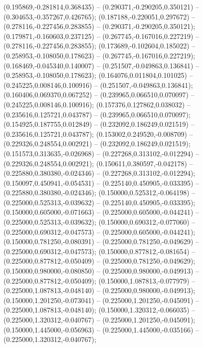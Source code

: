  (0.195869,-0.281814,0.368435) -- (0.290371,-0.290205,0.350121) -- (0.304653,-0.357267,0.426765);
 (0.187188,-0.220051,0.297672) -- (0.278116,-0.227456,0.283855) -- (0.290371,-0.290205,0.350121);
 (0.179871,-0.160603,0.237125) -- (0.267745,-0.167016,0.227219) -- (0.278116,-0.227456,0.283855);
 (0.173689,-0.102604,0.185022) -- (0.258953,-0.108050,0.178623) -- (0.267745,-0.167016,0.227219);
 (0.168469,-0.045340,0.140007) -- (0.251507,-0.049863,0.136841) -- (0.258953,-0.108050,0.178623);
 (0.164076,0.011804,0.101025) -- (0.245225,0.008146,0.100916) -- (0.251507,-0.049863,0.136841);
 (0.160406,0.069370,0.067252) -- (0.239965,0.066510,0.070097) -- (0.245225,0.008146,0.100916);
 (0.157376,0.127862,0.038032) -- (0.235616,0.125721,0.043787) -- (0.239965,0.066510,0.070097);
 (0.154925,0.187755,0.012849) -- (0.232092,0.186249,0.021519) -- (0.235616,0.125721,0.043787);
 (0.153002,0.249520,-0.008709) -- (0.229326,0.248554,0.002921) -- (0.232092,0.186249,0.021519);
 (0.151573,0.313635,-0.026968) -- (0.227268,0.313102,-0.012294) -- (0.229326,0.248554,0.002921);
 (0.150611,0.380597,-0.042178) -- (0.225880,0.380380,-0.024346) -- (0.227268,0.313102,-0.012294);
 (0.150097,0.450941,-0.054531) -- (0.225140,0.450905,-0.033395) -- (0.225880,0.380380,-0.024346);
 (0.150000,0.525312,-0.064198) -- (0.225000,0.525313,-0.039632) -- (0.225140,0.450905,-0.033395);
 (0.150000,0.605000,-0.071663) -- (0.225000,0.605000,-0.044241) -- (0.225000,0.525313,-0.039632);
 (0.150000,0.690312,-0.077060) -- (0.225000,0.690312,-0.047573) -- (0.225000,0.605000,-0.044241);
 (0.150000,0.781250,-0.080391) -- (0.225000,0.781250,-0.049629) -- (0.225000,0.690312,-0.047573);
 (0.150000,0.877812,-0.081654) -- (0.225000,0.877812,-0.050409) -- (0.225000,0.781250,-0.049629);
 (0.150000,0.980000,-0.080850) -- (0.225000,0.980000,-0.049913) -- (0.225000,0.877812,-0.050409);
 (0.150000,1.087813,-0.077979) -- (0.225000,1.087813,-0.048140) -- (0.225000,0.980000,-0.049913);
 (0.150000,1.201250,-0.073041) -- (0.225000,1.201250,-0.045091) -- (0.225000,1.087813,-0.048140);
 (0.150000,1.320312,-0.066035) -- (0.225000,1.320312,-0.040767) -- (0.225000,1.201250,-0.045091);
 (0.150000,1.445000,-0.056963) -- (0.225000,1.445000,-0.035166) -- (0.225000,1.320312,-0.040767);
